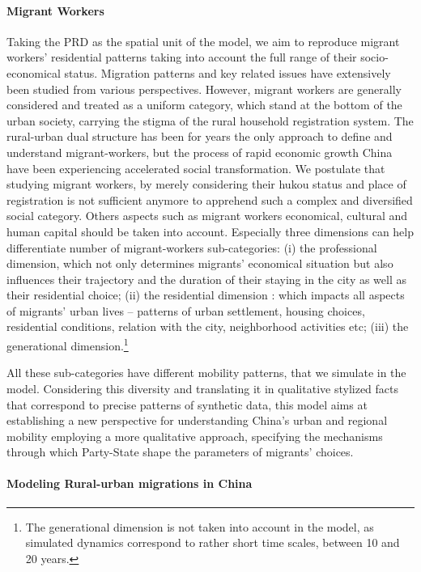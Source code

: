 \paragraph{Migrant Workers}
Taking the PRD as the spatial unit of the model, we aim to reproduce migrant workers’ residential patterns taking into account the full range of their socio-economical status. Migration patterns and key related issues have extensively been studied from various perspectives. However, migrant workers are generally considered and treated as a uniform category, which stand at the bottom of the urban society, carrying the stigma of the rural household registration system. The rural-urban dual structure has been for years the only approach to define and understand migrant-workers, but the process of rapid economic growth China have been experiencing accelerated social transformation. We postulate that studying migrant workers, by merely considering their hukou status and place of registration is not sufficient anymore to apprehend such a complex and diversified social category. Others aspects such as migrant workers economical, cultural and human capital should be taken into account.
Especially three dimensions can help differentiate number of migrant-workers sub-categories: (i) the professional dimension, which not only determines migrants’ economical situation but also influences their trajectory and the duration of their staying in the city as well as their residential choice; (ii) the residential dimension : which impacts all aspects of migrants’ urban lives – patterns of urban settlement, housing choices, residential conditions, relation with the city, neighborhood activities etc; (iii) the generational dimension.\footnote{The generational dimension is not taken into account in the model, as simulated dynamics correspond to rather short time scales, between 10 and 20 years.}




All these sub-categories have different mobility patterns, that we simulate in the model.
Considering this diversity and translating it in qualitative stylized facts that correspond to precise patterns of synthetic data, this model aims at establishing a new perspective for understanding China’s urban and regional mobility employing a more qualitative approach, specifying the mechanisms through which Party-State shape the parameters of migrants’ choices. 






\paragraph{Modeling Rural-urban migrations in China}

